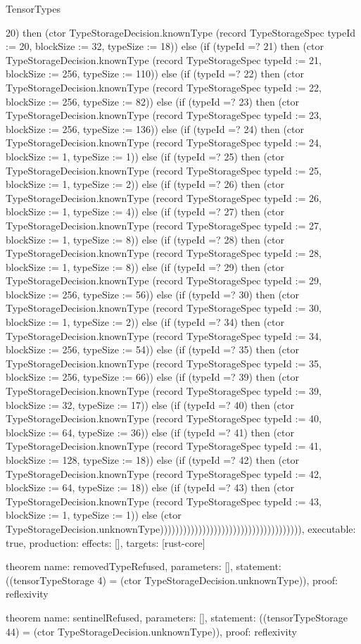 \begin{lexlean}{TensorTypes}
\begin{semanticmodule}
{20) then (ctor TypeStorageDecision.knownType (record TypeStorageSpec {typeId := 20, blockSize := 32, typeSize := 18})) else (if (typeId =? 21) then (ctor TypeStorageDecision.knownType (record TypeStorageSpec {typeId := 21, blockSize := 256, typeSize := 110})) else (if (typeId =? 22) then (ctor TypeStorageDecision.knownType (record TypeStorageSpec {typeId := 22, blockSize := 256, typeSize := 82})) else (if (typeId =? 23) then (ctor TypeStorageDecision.knownType (record TypeStorageSpec {typeId := 23, blockSize := 256, typeSize := 136})) else (if (typeId =? 24) then (ctor TypeStorageDecision.knownType (record TypeStorageSpec {typeId := 24, blockSize := 1, typeSize := 1})) else (if (typeId =? 25) then (ctor TypeStorageDecision.knownType (record TypeStorageSpec {typeId := 25, blockSize := 1, typeSize := 2})) else (if (typeId =? 26) then (ctor TypeStorageDecision.knownType (record TypeStorageSpec {typeId := 26, blockSize := 1, typeSize := 4})) else (if (typeId =? 27) then (ctor TypeStorageDecision.knownType (record TypeStorageSpec {typeId := 27, blockSize := 1, typeSize := 8})) else (if (typeId =? 28) then (ctor TypeStorageDecision.knownType (record TypeStorageSpec {typeId := 28, blockSize := 1, typeSize := 8})) else (if (typeId =? 29) then (ctor TypeStorageDecision.knownType (record TypeStorageSpec {typeId := 29, blockSize := 256, typeSize := 56})) else (if (typeId =? 30) then (ctor TypeStorageDecision.knownType (record TypeStorageSpec {typeId := 30, blockSize := 1, typeSize := 2})) else (if (typeId =? 34) then (ctor TypeStorageDecision.knownType (record TypeStorageSpec {typeId := 34, blockSize := 256, typeSize := 54})) else (if (typeId =? 35) then (ctor TypeStorageDecision.knownType (record TypeStorageSpec {typeId := 35, blockSize := 256, typeSize := 66})) else (if (typeId =? 39) then (ctor TypeStorageDecision.knownType (record TypeStorageSpec {typeId := 39, blockSize := 32, typeSize := 17})) else (if (typeId =? 40) then (ctor TypeStorageDecision.knownType (record TypeStorageSpec {typeId := 40, blockSize := 64, typeSize := 36})) else (if (typeId =? 41) then (ctor TypeStorageDecision.knownType (record TypeStorageSpec {typeId := 41, blockSize := 128, typeSize := 18})) else (if (typeId =? 42) then (ctor TypeStorageDecision.knownType (record TypeStorageSpec {typeId := 42, blockSize := 64, typeSize := 18})) else (if (typeId =? 43) then (ctor TypeStorageDecision.knownType (record TypeStorageSpec {typeId := 43, blockSize := 1, typeSize := 1})) else (ctor TypeStorageDecision.unknownType))))))))))))))))))))))))))))))))))))),
  executable: true,
  production: {effects: [], targets: [rust-core]}
}

theorem{
  name: removedTypeRefused,
  parameters: [],
  statement: ((tensorTypeStorage 4) = (ctor TypeStorageDecision.unknownType)),
  proof: reflexivity{}
}

theorem{
  name: sentinelRefused,
  parameters: [],
  statement: ((tensorTypeStorage 44) = (ctor TypeStorageDecision.unknownType)),
  proof: reflexivity{}
}
\end{semanticmodule}
\end{lexlean}
